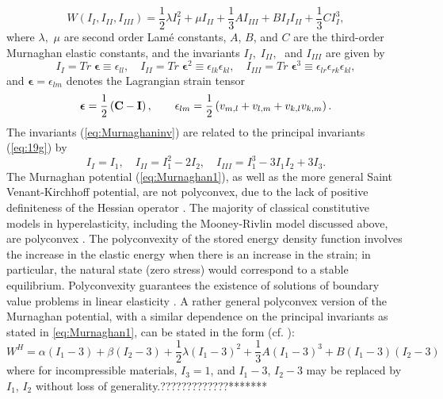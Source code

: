 \documentclass[11pt,letter,subeqn,fleqn]{article}
\numberwithin{equation}{section}
\numberwithin{table}{section}
\numberwithin{figure}{section}
\def\beq{\begin{equation}}
\def\eeq{\end{equation}}
\def\vec#1{{\boldsymbol{\rm #1}}} %
\def\tens#1{{\boldsymbol{\rm #1}}} %
\def\vec#1{{\boldsymbol{\rm #1}}} %
\def\tens#1{{\boldsymbol{\rm #1}}} %
\begin{document}
\begin{equation}\label{eq:Murnaghan1}
W(I_{I},I_{II}, I_{III})= \frac{1}{2}\lambda I^{2}_{I}+\mu I_{II}+\frac{1}{3}A I_{III}+B I_{I}I_{II}+\frac{1}{3}CI^{3}_{I},
\end{equation}
\noindent where $\lambda,$ $\mu$ are second order Lam\'e constants, $A$, $B$, and $C$ are the third-order Murnaghan elastic constants, and the invariants $I_{I},\;I_{II},\;$ and $I_{III}$ are given by
\begin{equation}\label{eq:Murnaghaninv}
I_{I}=Tr\;\boldsymbol{\epsilon}\equiv \epsilon_{ll},\quad I_{II}=Tr\;\boldsymbol{\epsilon}^2\equiv \epsilon_{lk}\epsilon_{kl} ,\quad I_{III}=Tr\;\boldsymbol{\epsilon}^3\equiv\epsilon_{lr}\epsilon_{rk}\epsilon_{kl},
\end{equation}
and $\boldsymbol{\epsilon}=\epsilon_{lm}$ denotes the Lagrangian strain tensor
\beq\label{LD}
\tens{\epsilon}=\frac{1}{2}\left(\vec{C}-\vec{I}\right),\qquad {\epsilon}_{lm}=\frac{1}{2}\left(v_{m,l}+v_{l,m}+v_{k,l}v_{k,m}\right).
\eeq
The invariants (\ref{eq:Murnaghaninv}) are related to the principal invariants (\ref{eq:19g}) by
\begin{equation}\label{eq:newinvMurnaghan}
I_{I}=I_{1},\quad I_{II}=I^{2}_{1}-2I_{2},\quad I_{III}=I^{3}_{1}-3I_{1}I_2
+3I_{3}.
\end{equation}
The Murnaghan potential (\ref{eq:Murnaghan1}), as well as the more general Saint Venant-Kirchhoff potential, are not polyconvex, due to the lack of positive definiteness of the Hessian operator \cite{ortigosa2016computational}. The majority of classical constitutive models in hyperelasticity, including the Mooney-Rivlin model discussed above, are polyconvex \cite{ciarlet1988mathematical}. The polyconvexity of the stored energy density function involves the increase in the elastic energy when there is an increase in the strain; in particular, the natural state (zero stress) would correspond to a stable equilibrium. Polyconvexity guarantees the existence of solutions of boundary value problems in linear elasticity \cite{kambouchev2007polyconvex}. A rather general polyconvex version of the Murnaghan potential, with a similar dependence on the principal invariants as stated in \eqref{eq:Murnaghan1}, can be stated in the form (cf. \cite{AgyThesis2020}):
\begin{equation}\label{eq:n}
W^{H}=\alpha (I_{1}-3)+\beta (I_{2}-3)+\frac{1}{2}\lambda (I_{1}-3)^{2}+\frac{1}{3} A (I_{1}-3)^{3}+B (I_{1}-3)(I_{2}-3)
\end{equation}
where for incompressible materials, $I_{3}=1$, and $I_{1}-3$, $I_{2}-3$ may be replaced by $I_{1}$, $I_{2}$ without loss of generality.?????????????*******
\end{document}

